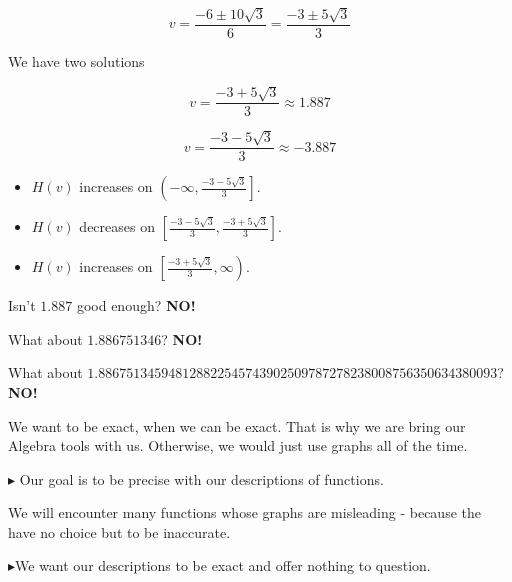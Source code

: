 \documentclass{ximera}
\begin{document}
\begin{example}
\[  v = \frac{-6 \pm 10\sqrt{3}}{6}  =  \frac{-3 \pm 5\sqrt{3}}{3} \]



We have two solutions


\[  v =  \frac{-3 + 5\sqrt{3}}{3}  \approx  1.887 \]


\[  v =  \frac{-3 - 5\sqrt{3}}{3} \approx   -3.887 \]



\begin{itemize}
\item $H(v)$ increases on $\left(-\infty, \frac{-3 - 5\sqrt{3}}{3}   \right]$.
\item $H(v)$ decreases on $\left[\frac{-3 - 5\sqrt{3}}{3} , \frac{-3 + 5\sqrt{3}}{3}   \right]$.
\item $H(v)$ increases on $\left[\frac{-3 + 5\sqrt{3}}{3}, \infty  \right)$.
\end{itemize}



\end{example}





Isn't $1.887$ good enough?  \textbf{NO!}  

What about $1.886751346$? \textbf{NO!}  

What about $1.886751345948128822545743902509787278238008756350634380093$? \textbf{NO!}  

We want to be exact, when we can be exact.  That is why we are bring our Algebra tools with us.  Otherwise, we would just use graphs all of the time.

$\blacktriangleright$ Our goal is to be precise with our descriptions of functions.


We will encounter many functions whose graphs are misleading - because the have no choice but to be inaccurate.

$\blacktriangleright$We want our descriptions to be exact and offer nothing to question.
\end{document}
